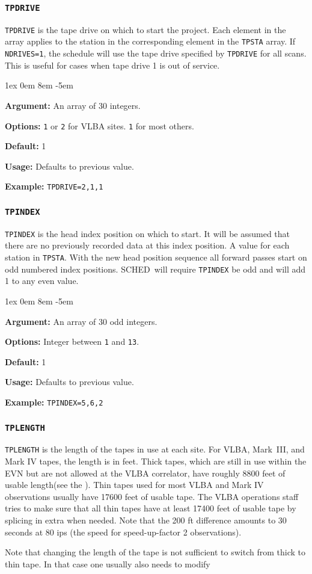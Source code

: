 \documentclass{report}
\newcommand{\schedb}{{\sc SCHED~}}
\newcommand{\rcwbox}[5]{
  \begin{list}{}{\parsep 1ex  \itemsep 0em
                 \leftmargin 8em  \itemindent -5em }
    \item {\bf Argument:} #1
    \item {\bf Options:}  #2
    \item {\bf Default:}  #3
    \item {\bf Usage:}    #4
    \item {\bf Example:}  #5
  \end{list}
}
\begin{document}
\subsubsection{\label{TP:TPDRIVE}{\tt TPDRIVE}}

{\tt TPDRIVE} is the tape drive on which to start the project. Each
element in the array applies to the station in the corresponding
element in the {\tt TPSTA} array. If {\tt NDRIVES=1}, the schedule
will use the tape drive specified by {\tt TPDRIVE} for all scans. This
is useful for cases when tape drive 1 is out of service.

\rcwbox
{An array of 30 integers.}
{{\tt 1} or {\tt 2} for VLBA sites. {\tt 1} for most others.}
{1}
{Defaults to previous value.}
{{\tt TPDRIVE=2,1,1}}

\subsubsection{\label{TP:TPINDEX}{\tt TPINDEX}}

{\tt TPINDEX} is the head index position on which to start. It will
be assumed that there are no previously recorded data at this index
position. A value for each station in {\tt TPSTA}. With the new head
position sequence all forward passes start on odd numbered index
positions. \schedb will require {\tt TPINDEX} be odd and will add
1 to any even value.

\rcwbox
{An array of 30 odd integers.}
{Integer between {\tt 1} and {\tt 13}.}
{1}
{Defaults to previous value.}
{{\tt TPINDEX=5,6,2}}

\subsubsection{\label{TP:TPLENGTH}{\tt TPLENGTH}}

{\tt TPLENGTH} is the length of the tapes in use at each site.  For
VLBA, Mark~III, and Mark IV tapes, the length is in feet.  Thick
tapes, which are still in use within the EVN but are not allowed at
the VLBA correlator, have roughly 8800 feet of usable length(see
the ).  Thin
tapes used for most VLBA and Mark IV observations usually have 17600
feet of usable tape.  The VLBA operations staff tries to make sure
that all thin tapes have at least 17400 feet of usable tape by
splicing in extra when needed.  Note that the 200 ft difference
amounts to 30 seconds at 80 ips (the speed for speed-up-factor 2
observations).

Note that changing the length of the tape is not sufficient to switch
from thick to thin tape. In that case one usually also needs to modify
\end{document}
